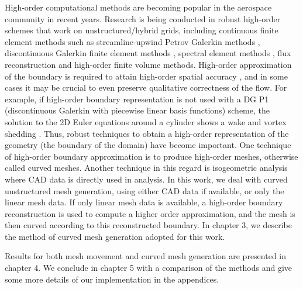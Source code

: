 High-order computational methods are becoming popular in the aerospace community in recent years. Research is being conducted in robust high-order schemes that work on unstructured/hybrid grids, including continuous finite element methods such as streamline-upwind Petrov Galerkin methods \cite{appl:supg}, discontinuous Galerkin finite element methods \cite{solver, curve:hartmann, appl:mavriplis}, spectral element methods \cite{appl:spectral}, flux reconstruction \cite{appl:fr} and high-order finite volume methods. High-order approximation of the boundary is required to attain high-order spatial accuracy \cite{curve:geomacc}, and in some cases it may be crucial to even preserve qualitative correctness of the flow. For example, if high-order boundary representation is not used with a DG P1 (discontinuous Galerkin with piecewise linear basis functions) scheme, the solution to the 2D Euler equations around a cylinder shows a wake and vortex shedding \cite{appl:dgeuler}. Thus, robust techniques to obtain a high-order representation of the geometry (the boundary of the domain) have become important.  One technique of high-order boundary approximation is to produce high-order meshes, otherwise called curved meshes. Another technique in this regard is isogeometric analysis \cite{isogeometric} where CAD data is directly used in analysis. In this work, we deal with curved unstructured mesh generation, using either CAD data if available, or only the linear mesh data. If only linear mesh data is available, a high-order boundary reconstruction is used to compute a higher order approximation, and the mesh is then curved according to this reconstructed boundary. In chapter 3, we describe the method of curved mesh generation adopted for this work.

Results for both mesh movement and curved mesh generation are presented in chapter 4. We conclude in chapter 5 with a comparison of the methods and give some more details of our implementation in the appendices.

